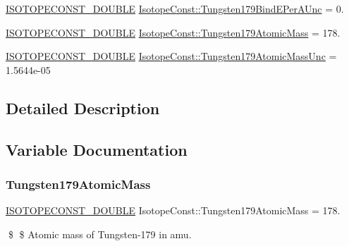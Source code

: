 \begin{DoxyCompactItemize}
\mbox{\hyperlink{group___isotope_const-_macros_ga8f45a7272ce02c0b4c65c44636ed719a}{I\+S\+O\+T\+O\+P\+E\+C\+O\+N\+S\+T\+\_\+\+D\+O\+U\+B\+LE}} \mbox{\hyperlink{group___isotope_const-_tungsten-_w179_ga4862d53bd745a35cf71ab4cdd9670e61}{Isotope\+Const\+::\+Tungsten179\+Bind\+E\+Per\+A\+Unc}} = 0.
\item 
\mbox{\hyperlink{group___isotope_const-_macros_ga8f45a7272ce02c0b4c65c44636ed719a}{I\+S\+O\+T\+O\+P\+E\+C\+O\+N\+S\+T\+\_\+\+D\+O\+U\+B\+LE}} \mbox{\hyperlink{group___isotope_const-_tungsten-_w179_ga13c578a49dac8f461eaa7cc4d864c05d}{Isotope\+Const\+::\+Tungsten179\+Atomic\+Mass}} = 178.
\item 
\mbox{\hyperlink{group___isotope_const-_macros_ga8f45a7272ce02c0b4c65c44636ed719a}{I\+S\+O\+T\+O\+P\+E\+C\+O\+N\+S\+T\+\_\+\+D\+O\+U\+B\+LE}} \mbox{\hyperlink{group___isotope_const-_tungsten-_w179_ga49fbc5f3f8ffabaf9869c020fc48dad8}{Isotope\+Const\+::\+Tungsten179\+Atomic\+Mass\+Unc}} = 1.\+5644e-\/05
\end{DoxyCompactItemize}


\subsection{Detailed Description}


\subsection{Variable Documentation}
\mbox{\label{group___isotope_const-_tungsten-_w179_ga13c578a49dac8f461eaa7cc4d864c05d}} 
\subsubsection{\texorpdfstring{Tungsten179\+Atomic\+Mass}{Tungsten179AtomicMass}}
{\footnotesize\ttfamily \mbox{\hyperlink{group___isotope_const-_macros_ga8f45a7272ce02c0b4c65c44636ed719a}{I\+S\+O\+T\+O\+P\+E\+C\+O\+N\+S\+T\+\_\+\+D\+O\+U\+B\+LE}} Isotope\+Const\+::\+Tungsten179\+Atomic\+Mass = 178.}

\$ \$ Atomic mass of Tungsten-\/179 in amu. \mbox{\label{group___isotope_const-_tungsten-_w179_ga49fbc5f3f8ffabaf9869c020fc48dad8}} 
